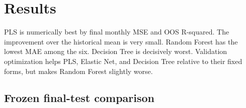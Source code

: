 \documentclass[
  11pt,
  a4paper]{article}
\begin{document}
\section{Results}\label{sec-12}

PLS is numerically best by final monthly MSE and OOS R-squared. The
improvement over the historical mean is very small. Random Forest has
the lowest MAE among the six. Decision Tree is decisively worst.
Validation optimization helps PLS, Elastic Net, and Decision Tree
relative to their fixed forms, but makes Random Forest slightly worse.

\subsection{Frozen final-test comparison}\label{sec-final-results}
\end{document}
